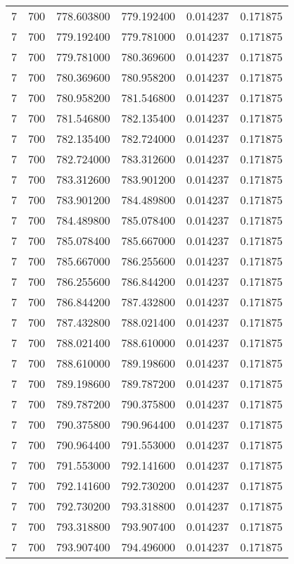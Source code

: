 \begin{longtable}{rrrrrr}
7 & 700 & 778.603800 & 779.192400 & 0.014237 & 0.171875 \\
7 & 700 & 779.192400 & 779.781000 & 0.014237 & 0.171875 \\
7 & 700 & 779.781000 & 780.369600 & 0.014237 & 0.171875 \\
7 & 700 & 780.369600 & 780.958200 & 0.014237 & 0.171875 \\
7 & 700 & 780.958200 & 781.546800 & 0.014237 & 0.171875 \\
7 & 700 & 781.546800 & 782.135400 & 0.014237 & 0.171875 \\
7 & 700 & 782.135400 & 782.724000 & 0.014237 & 0.171875 \\
7 & 700 & 782.724000 & 783.312600 & 0.014237 & 0.171875 \\
7 & 700 & 783.312600 & 783.901200 & 0.014237 & 0.171875 \\
7 & 700 & 783.901200 & 784.489800 & 0.014237 & 0.171875 \\
7 & 700 & 784.489800 & 785.078400 & 0.014237 & 0.171875 \\
7 & 700 & 785.078400 & 785.667000 & 0.014237 & 0.171875 \\
7 & 700 & 785.667000 & 786.255600 & 0.014237 & 0.171875 \\
7 & 700 & 786.255600 & 786.844200 & 0.014237 & 0.171875 \\
7 & 700 & 786.844200 & 787.432800 & 0.014237 & 0.171875 \\
7 & 700 & 787.432800 & 788.021400 & 0.014237 & 0.171875 \\
7 & 700 & 788.021400 & 788.610000 & 0.014237 & 0.171875 \\
7 & 700 & 788.610000 & 789.198600 & 0.014237 & 0.171875 \\
7 & 700 & 789.198600 & 789.787200 & 0.014237 & 0.171875 \\
7 & 700 & 789.787200 & 790.375800 & 0.014237 & 0.171875 \\
7 & 700 & 790.375800 & 790.964400 & 0.014237 & 0.171875 \\
7 & 700 & 790.964400 & 791.553000 & 0.014237 & 0.171875 \\
7 & 700 & 791.553000 & 792.141600 & 0.014237 & 0.171875 \\
7 & 700 & 792.141600 & 792.730200 & 0.014237 & 0.171875 \\
7 & 700 & 792.730200 & 793.318800 & 0.014237 & 0.171875 \\
7 & 700 & 793.318800 & 793.907400 & 0.014237 & 0.171875 \\
7 & 700 & 793.907400 & 794.496000 & 0.014237 & 0.171875 \\

\end{longtable}
